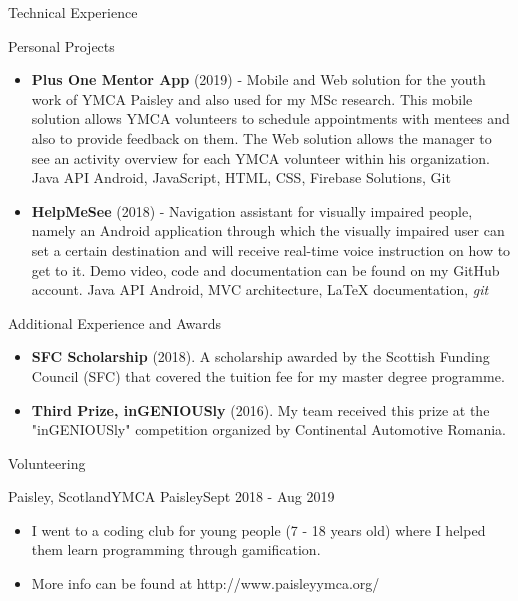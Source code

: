 \documentclass[]{mcdowellcv}
\begin{document}
	\begin{cvsection}{Technical Experience}
		\begin{cvsubsection}{Personal Projects}{}{}
			\begin{itemize}
				\item \textbf{Plus One Mentor App} (2019) - Mobile and Web solution for the youth work of YMCA Paisley and also used for my MSc research. This mobile solution allows YMCA volunteers to schedule appointments with mentees and also to provide feedback on them. The Web solution allows the manager to see an activity overview for each YMCA volunteer within his organization. Java API Android, JavaScript, HTML, CSS, Firebase Solutions, Git
				\item \textbf{HelpMeSee} (2018) - Navigation assistant for visually impaired people, namely an Android application through which the visually impaired user can set a certain destination and will receive real-time voice instruction on how to get to it. Demo video, code and documentation can be found on my GitHub account. Java API Android, MVC architecture, LaTeX documentation, \textit{git}
			\end{itemize}
		\end{cvsubsection}
	\end{cvsection}
	
	\begin{cvsection}{Additional Experience and Awards}
		\begin{cvsubsection}{}{}{}	
			\begin{itemize}
				\item \textbf{SFC Scholarship} (2018). A scholarship awarded by the Scottish Funding Council (SFC) that covered the tuition fee for my master degree programme.
				\item \textbf{Third Prize, inGENIOUSly} (2016). My team received this prize at the "inGENIOUSly" competition organized by Continental Automotive Romania.
			\end{itemize}
		\end{cvsubsection}
	\end{cvsection}

	\begin{cvsection}{Volunteering}
		\begin{cvsubsection}{Paisley, Scotland}{YMCA Paisley}{Sept 2018 - Aug 2019}
			\begin{itemize}
				\item I went to a coding club for young people (7 - 18 years old) where I helped them learn programming through gamification. 
				\item More info can be found at http://www.paisleyymca.org/
			\end{itemize}
		\end{cvsubsection}
	\end{cvsection}
\end{document}
